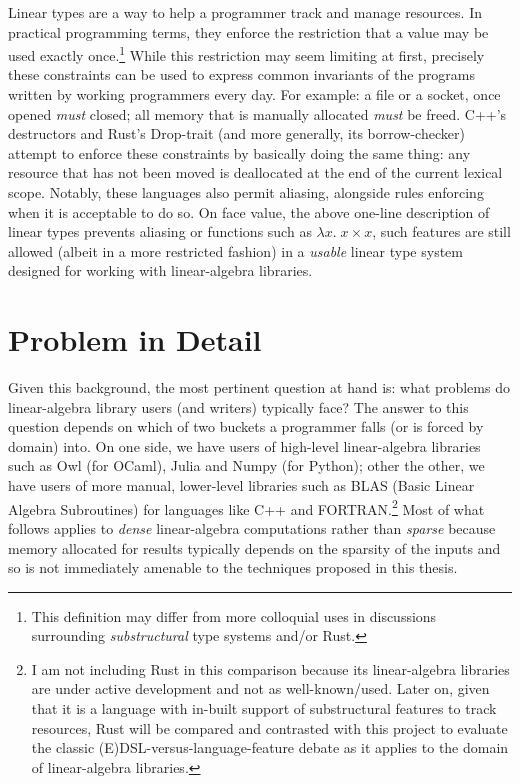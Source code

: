Linear types are a way to help a programmer track and manage resources. In
practical programming terms, they enforce the restriction that a value may be
used exactly once.\footnote{This definition may differ from more colloquial
uses in discussions surrounding \emph{substructural} type systems and/or
Rust.} While this restriction may seem limiting at first, precisely these
constraints can be used to express common invariants of the programs written by
working programmers every day. For example: a file or a socket, once opened
\emph{must} closed; all memory that is manually allocated \emph{must} be freed.
C++'s destructors and Rust's Drop-trait (and more generally, its
borrow-checker) attempt to enforce these constraints by basically doing the
same thing: any resource that has not been moved is deallocated at the end of
the current lexical scope. Notably, these languages also permit aliasing,
alongside rules enforcing when it is acceptable to do so.  On face value, the
above one-line description of linear types prevents aliasing or functions such
as $\lambda x.\;x \times x$, such features are still allowed (albeit in a more
restricted fashion) in a \emph{usable} linear type system designed for working
with linear-algebra libraries.

\section{Problem in Detail}
Given this background, the most pertinent question at hand is: what problems do
linear-algebra library users (and writers) typically face? The answer to this
question depends on which of two buckets a programmer falls (or is forced by
domain) into. On one side, we have users of high-level linear-algebra libraries such
as Owl (for OCaml), Julia and Numpy (for Python); other the other, we have
users of more manual, lower-level libraries such as BLAS (Basic Linear Algebra
Subroutines) for languages like C++ and FORTRAN.\footnote{I am not including
Rust in this comparison because its linear-algebra libraries are under active
development and not as well-known/used. Later on, given that it is a language
with in-built support of substructural features to track resources, Rust will
be compared and contrasted with this project to evaluate the classic
(E)DSL-versus-language-feature debate as it applies to the domain of
linear-algebra libraries.} Most of what follows applies to \emph{dense}
linear-algebra computations rather than \emph{sparse} because memory
allocated for results typically depends on the sparsity of the inputs and
so is not immediately amenable to the techniques proposed in this thesis.

